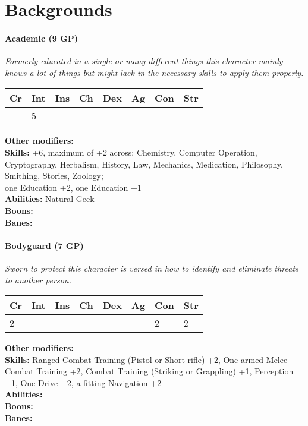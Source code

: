 \section{Backgrounds}
\label{sec:backgroundlist}
\paragraph*{Academic (9 GP)}
\textit{Formerly educated in a single or many different things this character mainly knows a lot of things but might lack in the necessary skills to apply them properly.}\par
\begin{tabular}{|l|l|l|l|l|l|l|l|}
	\hline
	Cr & Int & Ins & Ch & Dex & Ag & Con & Str \\ \hline
	& 5 &  &  &  &  &  &  \\ \hline
\end{tabular}\par
\noindent\textbf{Other modifiers:} \\
\textbf{Skills:} +6, maximum of +2 across: Chemistry, Computer Operation, Cryptography, Herbalism, History, Law, Mechanics, Medication, Philosophy, Smithing, Stories, Zoology;\\
one Education +2,
one Education +1\\
\textbf{Abilities:} Natural Geek\\
\textbf{Boons:} \\
\textbf{Banes:} \\

\hrulefill
\paragraph*{Bodyguard (7 GP)}
\textit{Sworn to protect this character is versed in how to identify and eliminate threats to another person.}\par
\begin{tabular}{|l|l|l|l|l|l|l|l|}
	\hline
	Cr & Int & Ins & Ch & Dex & Ag & Con & Str \\ \hline
	2 &  &  &  &  &  & 2 & 2 \\ \hline
\end{tabular}\par
\noindent\textbf{Other modifiers:} \\
\textbf{Skills:} Ranged Combat Training (Pistol or Short rifle) +2,
One armed Melee Combat Training +2,
Combat Training (Striking or Grappling) +1,
Perception +1,
One Drive +2,
a fitting Navigation +2\\
\textbf{Abilities:} \\
\textbf{Boons:} \\
\textbf{Banes:} \\

